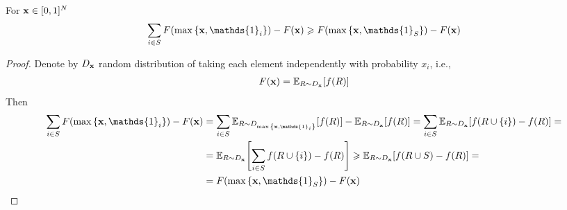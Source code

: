 \begin{lemma}
	For $\vb{x}\in [0,1]^N$
	\begin{align}
	\sum_{i \in S} F\qty(\max\qty{\vb{x}, \mathds{1}_i})-F(\vb{x}) \geqslant F\qty(\max\qty{\vb{x}, \mathds{1}_{S}})-F(\vb{x})
	\end{align}
	\begin{proof}
		Denote by $D_{\vb{x}}$ random distribution of taking each element independently with probability $x_i$, i.e.,
		\begin{align}
		F(\vb{x}) = \mathbb{E}_{R\sim D_{\vb{x}}} [f(R)]
		\end{align}
		Then
		\begin{align}
		\sum_{i \in S} F\qty(\max\qty{\vb{x}, \mathds{1}_i})-F(\vb{x}) &= \sum_{i \in S} \mathbb{E}_{R\sim D_{\max\qty{\vb{x}, \mathds{1}_i}}} [f(R)] - \mathbb{E}_{R\sim D_{\vb{x}}} [f(R)] = \sum_{i \in S}\mathbb{E}_{R\sim D_{\vb{x}}}\qty[f(R\cup \qty{i}) - f(R)] =\\&= \mathbb{E}_{R\sim D_{\vb{x}}}\qty[\sum_{i \in S} f(R\cup \qty{i}) - f(R)] \geqslant \mathbb{E}_{R\sim D_{\vb{x}}}\qty[f(R\cup S) - f(R)] =\\&= F\qty(\max\qty{\vb{x}, \mathds{1}_{S}})-F(\vb{x})
		\end{align}
	\end{proof}
\end{lemma}
